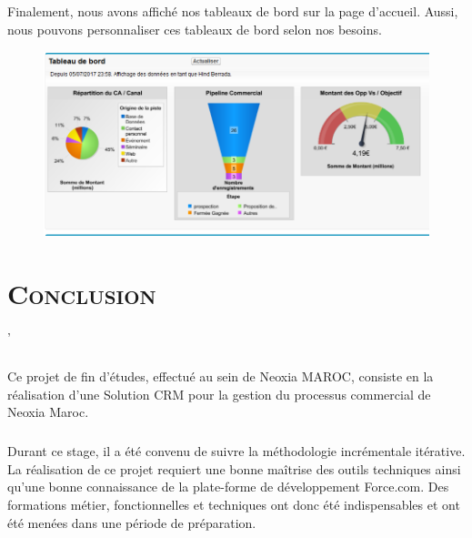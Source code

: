 \documentclass[a4paper, 12pt]{report}
\begin{document}
\begin{itemize}
\paragraph{}
Finalement, nous avons affiché nos tableaux de bord sur la page d'accueil. Aussi, nous pouvons personnaliser ces tableaux de bord selon nos besoins.
\begin{figure}[H]
	\centering
		\includegraphics{rapports.PNG}
	\label{fig:rapports}
\end{figure}
 






\chapter*{\textsc{Conclusion}}

'\paragraph{}
Ce projet de fin d'études, effectué au sein de Neoxia MAROC, consiste en la réalisation d'une Solution CRM pour la gestion du processus commercial de Neoxia Maroc.
\paragraph{}
Durant ce stage, il a été convenu de suivre la méthodologie incrémentale itérative. La réalisation de ce projet requiert une bonne maîtrise des outils techniques ainsi qu'une bonne connaissance de la plate-forme de développement Force.com. Des formations métier, fonctionnelles et techniques ont donc été indispensables et ont été menées dans une période de préparation. 

\end{itemize}
\end{document}
